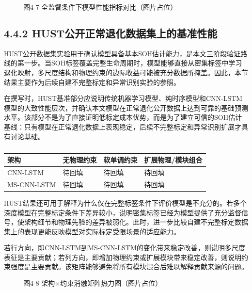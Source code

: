 \documentclass[12pt, a4paper]{ctexart}
\begin{document}
\begin{figure}[H]
  \centering
  \caption{图4-7  全监督条件下模型性能指标对比（图片占位）}
  \label{fig:}
\end{figure}


\subsection{4.4.2 HUST公开正常退化数据集上的基准性能}

HUST公开数据集实验用于确认模型具备基本SOH估计能力，是本文三阶段验证路线的第一步。当SOH标签覆盖完整生命周期时，模型能够直接从密集标签中学习退化映射，多尺度结构和物理约束的边际收益可能被充分数据所掩盖。因此，本节结果主要作为后续自建不完整标定和异常识别实验的参照。


在撰写时，HUST基准部分应说明传统机器学习模型、纯时序模型和CNN-LSTM模型的大致性能层次，并确认本文模型在正常退化公开数据上达到可靠的基础预测水平。该部分不是为了直接证明低标定成本优势，而是为了建立可信的SOH估计基线：只有模型在正常退化数据上表现稳定，后续不完整标定和异常识别扩展才具有讨论基础。



\begin{table}[H]
  \centering
  \begin{tabular}{llll}
  \toprule
  架构 & 无物理约束 & 软单调约束 & 扩展物理/模块组合 \\
  \midrule
  CNN-LSTM & 待回填 & 待回填 & 待回填 \\
  MS-CNN-LSTM & 待回填 & 待回填 & 待回填 \\
  \bottomrule
  \end{tabular}
  \caption{}
  \label{tab:}
\end{table}

HUST结果还可用于解释为什么仅在完整标签条件下评价模型是不充分的。若多个深度模型在完整标定条件下差异较小，说明密集标签已经为模型提供了充分监督信号，使架构细节和物理先验的差异被弱化。此时，进一步比较自建不完整标定数据集上的表现更能反映模型对实际标定受限场景的适应能力。


若行方向，即CNN-LSTM到MS-CNN-LSTM的变化带来稳定改善，则说明多尺度表征是主要贡献；若列方向，即增加物理约束或扩展模块带来稳定改善，则说明约束强度是主要贡献。该矩阵能够避免将所有模块混合后难以解释贡献来源的问题。



\begin{figure}[H]
  \centering
  \caption{图4-8  架构×约束消融矩阵热力图（图片占位）}
  \label{fig:}
\end{figure}
\end{document}
